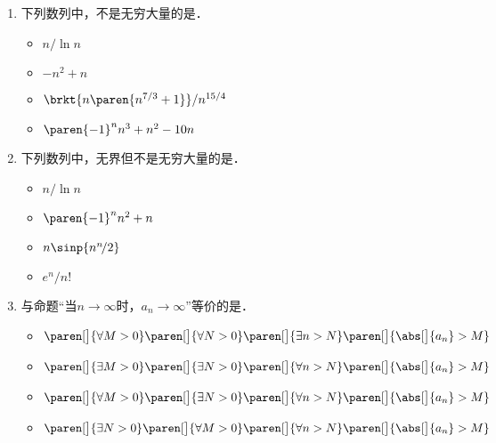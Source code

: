 \documentclass[a4paper,punct=CCT]{ctexbook}
\theoremstyle{definition}
\theoremstyle{remark}
\newif\ifshowsol
\begin{document}
\begin{enumerate}
\item 下列数列中，不是无穷大量的是\uline{\makebox[8em]{}}．
  \begin{itemize}
    \renewcommand{\labelitemi}{\faCircleThin}
  \item \(n/\!\ln n\)
  \item \(-n^2 + n\)
    \ifshowsol
  \item[\faCircle]
    \else
  \item
    \fi
    \(\brkt{n\paren{n^{7/3}+1}}/n^{15/4}\)
  \item \(\paren{-1}^n n^3 + n^2 - 10n\)
  \end{itemize}

\item 下列数列中，无界但不是无穷大量的是\uline{\makebox[6em]{}}．
  \begin{itemize}
    \renewcommand{\labelitemi}{\faCircleThin}
  \item \(n/\!\ln n\)
  \item \(\paren{-1}^n n^2 + n\)
    \ifshowsol
  \item[\faCircle]
    \else
  \item
    \fi
    \(n \sinp{n^n\!/2}\)
  \item \(e^n\!/n!\)
  \end{itemize}

\item 与命题“当\(n\to\infty\)时，\(a_n\to\infty\)”等价的是\uline{\makebox[10em]{}}．
  \begin{itemize}
    \renewcommand{\labelitemi}{\faCircleThin}
  \item \(
    \paren[\big]{\forall M > 0}
    \paren[\big]{\forall N > 0}
    \paren[\big]{\exists n > N}
    \paren[\big]{\abs[\big]{a_n} > M}
    \)
  \item \(
    \paren[\big]{\exists M > 0}
    \paren[\big]{\exists N > 0}
    \paren[\big]{\forall n > N}
    \paren[\big]{\abs[\big]{a_n} > M}
    \)
    \ifshowsol
  \item[\faCircle]
    \else
  \item
    \fi
    \(
    \paren[\big]{\forall M > 0}
    \paren[\big]{\exists N > 0}
    \paren[\big]{\forall n > N}
    \paren[\big]{\abs[\big]{a_n} > M}
    \)
  \item \(
    \paren[\big]{\exists N > 0}
    \paren[\big]{\forall M > 0}
    \paren[\big]{\forall n > N}
    \paren[\big]{\abs[\big]{a_n} > M}
    \)
  \end{itemize}

  \ifshowsol
  选项A其实相当于是说数列\(\Seq{a_n}\)无界，选项D是一个不可满足的命题．
  \fi


\end{enumerate}
\end{document}
